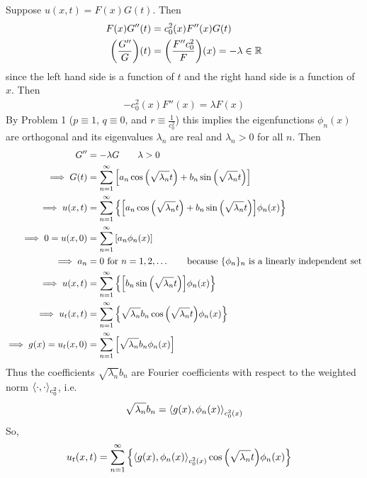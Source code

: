 Suppose $u(x,t) = F(x)G(t)$.  Then
\begin{align*}
    F(x)G''(t) &= c_0^2(x)F''(x)G(t) \\
    \qty(\frac{G''}{G})(t) &= \qty(\frac{F''c_0^2}{F})(x) = -\lambda \in \mathbb{R}
\end{align*}
since the left hand side is a function of $t$ and the right hand side is a function of $x$.  Then
\begin{align*}
    -c_0^2(x)F''(x) = \lambda F(x)
\end{align*}
By Problem 1 ($p \equiv 1$, $q \equiv 0$, and $r \equiv \frac{1}{c_0^2}$) this implies the eigenfunctions $\phi_n(x)$ are orthogonal and its eigenvalues $\lambda_n$ are real and $\lambda_n > 0$ for all $n$.  Then
\begin{align*}
    G'' &= -\lambda G \qquad \lambda > 0 \\
    \implies G(t) &= \sum_{n=1}^\infty \qty[a_n\cos\qty(\sqrt{\lambda_n}t) + b_n\sin\qty(\sqrt{\lambda_n}t)] \\
    \implies u(x,t) &= \sum_{n=1}^\infty \left\{\qty[a_n\cos\qty(\sqrt{\lambda_n}t) + b_n\sin\qty(\sqrt{\lambda_n}t)]\phi_n(x)\right\} \\
    \implies 0 = u(x,0) &= \sum_{n=1}^\infty \qty[a_n\phi_n(x)] \\
    \implies a_n &= 0 \text{ for } n = 1, 2, \dots \qquad \text{because $\{\phi_n\}_n$ is a linearly independent set} \\
    \implies u(x,t) &= \sum_{n=1}^\infty \left\{\qty[b_n\sin\qty(\sqrt{\lambda_n}t)]\phi_n(x)\right\} \\
    \implies u_t(x,t) &= \sum_{n=1}^\infty \left\{\sqrt{\lambda_n}b_n\cos\qty(\sqrt{\lambda_n}t)\phi_n(x)\right\} \\
    \implies g(x) = u_t(x,0) &= \sum_{n=1}^\infty \qty[\sqrt{\lambda_n}b_n\phi_n(x)]
\end{align*}
Thus the coefficients $\sqrt{\lambda_n}b_n$ are Fourier coefficients with respect to the weighted norm $\left\langle \cdot, \cdot \right\rangle_{c_0^2}$, i.e.
\begin{align*}
    \sqrt{\lambda_n}b_n = \left\langle g(x), \phi_n(x) \right\rangle_{c_0^2(x)}
\end{align*}
So,
\begin{align*}
    u_t(x,t) &= \sum_{n=1}^\infty \left\{\left\langle g(x), \phi_n(x) \right\rangle_{c_0^2(x)}\cos\qty(\sqrt{\lambda_n}t)\phi_n(x)\right\}
\end{align*}
